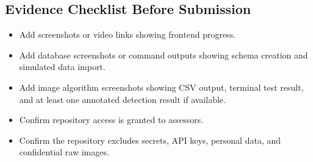 \subsection{Evidence Checklist Before Submission}

\begin{itemize}
  \item Add screenshots or video links showing frontend progress.
  \item Add database screenshots or command outputs showing schema creation and simulated data import.
  \item Add image algorithm screenshots showing CSV output, terminal test result, and at least one annotated detection result if available.
  \item Confirm repository access is granted to assessors.
  \item Confirm the repository excludes secrets, API keys, personal data, and confidential raw images.
\end{itemize}
